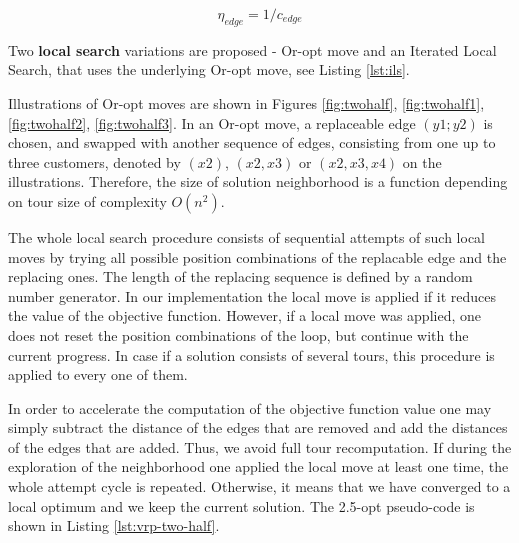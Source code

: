 \documentclass[11pt,a4paper,oneside]{book}
\begin{document}
\begin{equation}
\label{eq:vrp_heuristic_value}
\eta_{edge} = 1 / c_{edge}
\end{equation}

Two \textbf{local search} variations are proposed - Or-opt move \cite{Stattenberger2007} and an Iterated Local Search, that uses the underlying Or-opt move, see Listing \ref{lst:ils}.

Illustrations of Or-opt moves are shown in Figures \ref{fig:twohalf}, \ref{fig:twohalf1}, \ref{fig:twohalf2}, \ref{fig:twohalf3}. In an Or-opt move, a replaceable edge $(y1;y2)$ is chosen, and swapped with another sequence of edges, consisting from one up to three customers, denoted by $(x2)$, $(x2,x3)$ or $(x2,x3,x4)$ on the illustrations. Therefore, the size of solution neighborhood is a function depending on tour size of complexity $O(n^2)$.

The whole local search procedure consists of sequential attempts of such local moves by trying all possible position combinations of the replacable edge and the replacing ones. The length of the replacing sequence is defined by a random number generator. In our implementation the local move is applied if it reduces the value of the objective function. However, if a local move was applied, one does not reset the position combinations of the loop, but continue with the current progress. In case if a solution consists of several tours, this procedure is applied to every one of them.

In order to accelerate the computation of the objective function value one may simply subtract the distance of the edges that are removed and add the distances of the edges that are added. Thus, we avoid full tour recomputation. If during the exploration of the neighborhood one applied the local move at least one time, the whole attempt cycle is repeated. Otherwise, it means that we have converged to a local optimum and we keep the current solution. The 2.5-opt pseudo-code is shown in Listing \ref{lst:vrp-two-half}.
\end{document}
